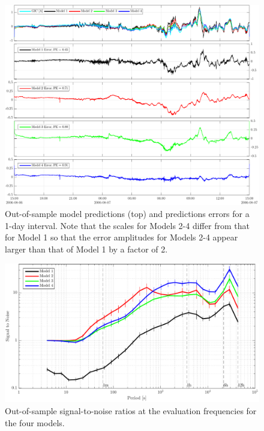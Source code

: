 \documentclass[draft,linenumbers]{agujournal2018}
\begin{document}
\begin{figure}[h]
\centering
\includegraphics[width=\textwidth]{figures/plot_model_predictions-MeanModel-20060806T150000.pdf}
\caption{Out-of-sample model predictions (top) and predictions errors for a 1-day interval. Note that the scales for Models 2-4 differ from that for Model 1 so that the error amplitudes for Models 2-4 appear larger than that of Model 1 by a factor of 2.}
\label{predictions}
\end{figure}

\begin{figure}[h]
\centering
\includegraphics[width=\textwidth]{figures/plot_model_summary_SN-options-1.pdf}
\caption{Out-of-sample signal-to-noise ratios at the evaluation frequencies for the four models.}
\label{SN}
\end{figure}
\end{document}
